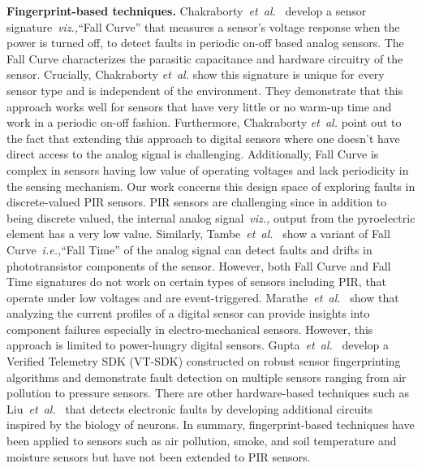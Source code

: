 \documentclass[manuscript]{acmart}
\newcommand{\viz}{{\it viz.,}\xspace}
\newcommand{\etal}{{\it et~al.}\xspace}
\newcommand{\ie}{{\it i.e.,}\xspace}
\begin{document}
\textbf{Fingerprint-based techniques.} Chakraborty~\etal~\cite{chakraborty2018fall} develop a sensor signature~\viz ``Fall Curve'' that measures a sensor's voltage response when the power is turned off, to detect faults in periodic on-off based analog sensors. 
The Fall Curve characterizes the parasitic capacitance and hardware circuitry of the sensor. Crucially, Chakraborty \etal show this signature is unique for every sensor type and is independent of the environment. They demonstrate that this approach works well for sensors that have very little or no warm-up time and work in a periodic on-off fashion. 
Furthermore, Chakraborty \etal \cite{chakraborty2018fall} point out to the fact that extending this approach to digital sensors where one doesn't have direct access to the analog signal is challenging. Additionally, Fall Curve is complex in sensors having low value of operating voltages and lack periodicity in the sensing mechanism. Our work concerns this design space of exploring faults in discrete-valued PIR sensors. PIR sensors are challenging since in addition to being discrete valued, the internal analog signal~\viz output from the pyroelectric element has a very low value. 
Similarly, Tambe~\etal~\cite{10.1145/3458864.3466869} show a variant of Fall Curve~\ie ``Fall Time'' of the analog signal can detect faults and drifts in phototransistor components of the sensor.
However, both Fall Curve and Fall Time signatures do not work on certain types of sensors including PIR, that operate under low voltages and are event-triggered. Marathe~\etal~\cite{marathe2021currentsense} show that analyzing the current profiles of a digital sensor can provide insights into component failures especially in electro-mechanical sensors. However, this approach is limited to power-hungry digital sensors. Gupta~\etal~\cite{10.1145/3576842.3582386} develop a Verified Telemetry SDK (VT-SDK) constructed on robust sensor fingerprinting algorithms and demonstrate fault detection on multiple sensors ranging from air pollution to pressure sensors.
There are other hardware-based techniques such as Liu~\etal~\cite{Liu_Huang_Luo_Harkin_McDaid_2019} that detects electronic faults by developing additional circuits inspired by the biology of neurons.
In summary, fingerprint-based techniques have been applied to sensors such as air pollution, smoke, and soil temperature and moisture sensors but have not been extended to PIR sensors.
\end{document}
